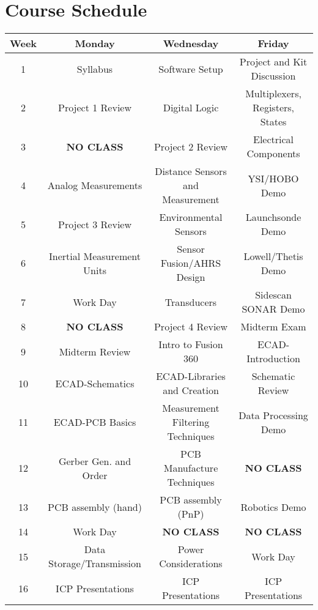 \section*{Course Schedule}
\begin{table*}[h!]
    \begin{tabular}{ c | c | c | c }
        \toprule
        Week & Monday & Wednesday & Friday \\

        \midrule
        1   & Syllabus                      & Software Setup                    & Project and Kit Discussion        \\
        2   & Project 1 Review              & Digital Logic                     & Multiplexers, Registers, States   \\    
        3   & \textbf{NO CLASS}             & Project 2 Review                  & Electrical Components             \\
        4   & Analog Measurements           & Distance Sensors and Measurement  & YSI/HOBO Demo                     \\
        5   & Project 3 Review              & Environmental Sensors             & Launchsonde Demo                  \\
        6   & Inertial Measurement Units    & Sensor Fusion/AHRS Design         & Lowell/Thetis Demo                \\
        7   & Work Day                      & Transducers                       & Sidescan SONAR Demo               \\
        8   & \textbf{NO CLASS}             & Project 4 Review                  & Midterm Exam                      \\
        9   & Midterm Review                & Intro to Fusion 360               & ECAD-Introduction                 \\
        10  & ECAD-Schematics               & ECAD-Libraries and Creation       & Schematic Review                  \\
        11  & ECAD-PCB Basics               & Measurement Filtering Techniques  & Data Processing Demo              \\
        12  & Gerber Gen. and Order         & PCB Manufacture Techniques        & \textbf{NO CLASS}                 \\
        13  & PCB assembly (hand)           & PCB assembly (PnP)                & Robotics Demo                     \\
        14  & Work Day                      & \textbf{NO CLASS}                 & \textbf{NO CLASS}                 \\
        15  & Data Storage/Transmission     & Power Considerations              & Work Day                          \\
        16  & ICP Presentations             & ICP Presentations                 & ICP Presentations                 \\

        \bottomrule
    \end{tabular}
\end{table*}

